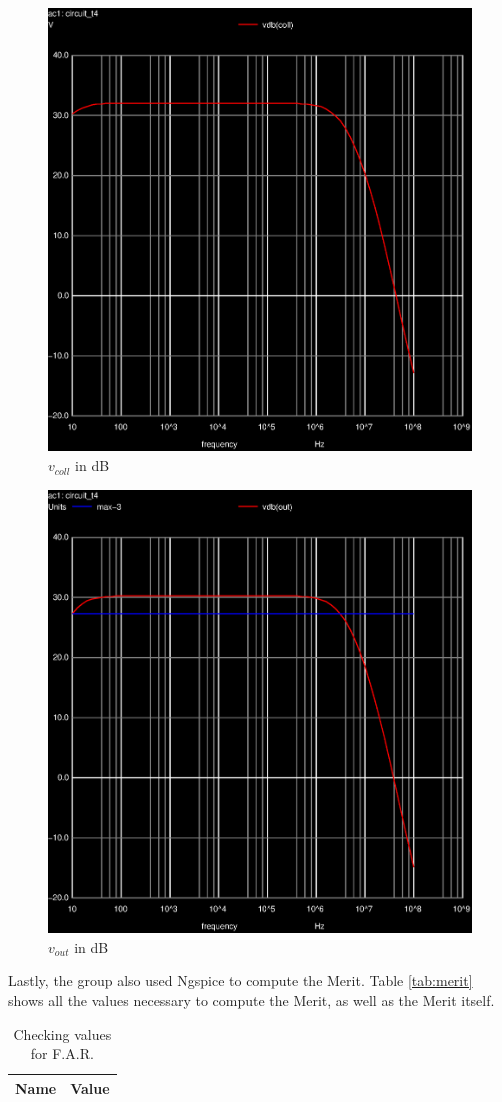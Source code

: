 \begin{figure}[ht]
	\centering
	\includegraphics[width=0.6\linewidth]{vo1f.eps}
	\caption{$v_{coll}$ in dB}
\label{fig:EV_vout}
\end{figure}

\begin{figure}[ht]
	\centering
	\includegraphics[width=0.6\linewidth]{vo2f.eps}
	\caption{$v_{out}$ in dB}
\label{fig:VR_vout}
\end{figure}



Lastly, the group also used Ngspice to compute the Merit. Table \ref{tab:merit} shows all the 
values necessary to compute the Merit, as well as the Merit itself.

\begin{table}[h]
	\centering
	\begin{tabular}{|l|r|}
		\hline    
		{\bf Name} & {\bf Value} \\ \hline
    		
	\end{tabular}
	
	\caption{Checking values for F.A.R.}
    
\label{tab:op_sim}
\end{table}

